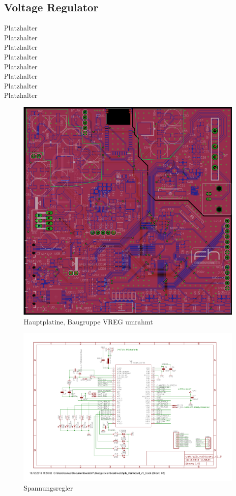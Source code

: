 \documentclass[a4paper]{scrartcl}
\begin{document}
\subsection{Voltage Regulator}

Platzhalter\\Platzhalter\\Platzhalter\\Platzhalter\\Platzhalter\\Platzhalter\\
Platzhalter\\Platzhalter

\begin{figure}[H]\centering
\includegraphics[page=1, angle=0, width=\linewidth]{../Documentation/pics/mainboard_vreg.png}
\caption{Hauptplatine, Baugruppe VREG umrahmt}
\end{figure}

\begin{figure}[H]\centering
\includegraphics[page=8, angle=90, width=\linewidth]{../eagle/Mainboard/watchplb_mainboard_v1_0.pdf}
\caption{Spannungsregler}
\end{figure}
\end{document}
